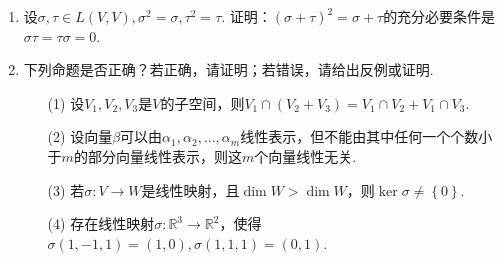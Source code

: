\begin{enumerate}
    \item 设\(\sigma,\tau \in L(V,V),\sigma^2 = \sigma,\tau^2 = \tau\). 证明：\((\sigma + \tau)^2 = \sigma + \tau\)的充分必要条件是\(\sigma\tau = \tau\sigma = 0\).

    \item 下列命题是否正确？若正确，请证明；若错误，请给出反例或证明.
          \begin{enumerate}
              \item[(1)] 设\(V_1,V_2,V_3\)是\(V\)的子空间，则\(V_1 \cap \left( V_2 + V_3 \right) = V_1 \cap V_2 + V_1 \cap V_3\).
              \item[(2)] 设向量\(\beta\)可以由\(\alpha_1,\alpha_2,\ldots,\alpha_{m}\)线性表示，但不能由其中任何一个个数小于\(m\)的部分向量线性表示，则这\(m\)个向量线性无关.
              \item[(3)] 若\(\sigma:V \rightarrow W\)是线性映射，且\(\dim W > \dim W\)，则\(\ker\sigma \neq \left\{ 0 \right\}\).
              \item[(4)] 存在线性映射\(\sigma:\mathbb{R}^3 \rightarrow \mathbb{R}^2\)，使得\(\sigma(1, - 1,1) = (1,0),\sigma(1,1,1) = (0,1)\).
          \end{enumerate}
\end{enumerate}

\clearpage
